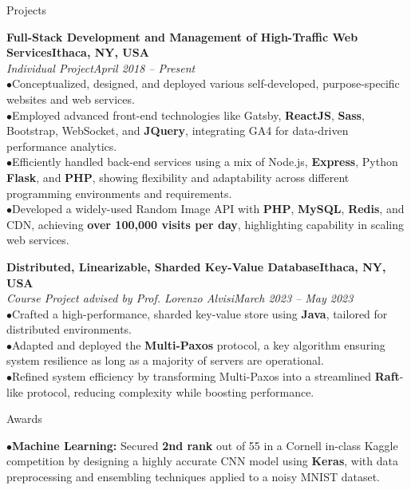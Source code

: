 \documentclass{resume} %
\begin{document}
\begin{rSection}{Projects}


{\bf Full-Stack Development and Management of High-Traffic Web Services}\hfill{\textbf{Ithaca, NY, USA}}
\\{\em Individual Project}\hfill {\em April 2018 -- Present}
\\ $ \bullet $Conceptualized, designed, and deployed various self-developed, purpose-specific websites and web services.
\\ $ \bullet $Employed advanced front-end technologies like Gatsby, \textbf{ReactJS}, \textbf{Sass}, Bootstrap, WebSocket, and \textbf{JQuery}, integrating GA4 for data-driven performance analytics.
\\ $ \bullet $Efficiently handled back-end services using a mix of Node.js, \textbf{Express}, Python \textbf{Flask}, and \textbf{PHP}, showing flexibility and adaptability across different programming environments and requirements.
\\ $ \bullet $Developed a widely-used Random Image API with \textbf{PHP}, \textbf{MySQL}, \textbf{Redis}, and CDN, achieving \textbf{over 100,000 visits per day}, highlighting capability in scaling web services.

{\bf Distributed, Linearizable, Sharded Key-Value Database}\hfill{\textbf{Ithaca, NY, USA}}
\\{\em Course Project advised by Prof. Lorenzo Alvisi}\hfill {\em March 2023 -- May 2023}
\\ $ \bullet $Crafted a high-performance, sharded key-value store using \textbf{Java}, tailored for distributed environments.
\\ $ \bullet $Adapted and deployed the \textbf{Multi-Paxos} protocol, a key algorithm ensuring system resilience as long as a majority of servers are operational.
\\ $ \bullet $Refined system efficiency by transforming Multi-Paxos into a streamlined \textbf{Raft}-like protocol, reducing complexity while boosting performance.

\end{rSection}



\begin{rSection}{Awards}

$ \bullet $\textbf{Machine Learning:} Secured \textbf{2nd rank} out of 55 in a Cornell in-class Kaggle competition by designing a highly accurate CNN model using \textbf{Keras}, with data preprocessing and ensembling techniques applied to a noisy MNIST dataset.

\end{rSection}

\newpage
\end{document}
